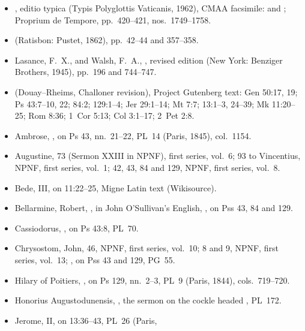 {\footnotesize
\begin{itemize}[leftmargin=1.2em,itemsep=.15em]
\item {}, editio typica (Typis
Polyglottis Vaticanis, 1962), CMAA facsimile:  and
; Proprium de Tempore,
pp.~420--421, nos.~1749--1758.
\item {} (Ratisbon: Pustet, 1862), pp.~42--44 and
357--358.
\item Lasance, F.~X., and Walsh, F.~A., , revised edition (New York: Benziger Brothers, 1945), pp.~196 and
744--747.
\item {} (Douay--Rheims,
Challoner revision), Project Gutenberg text: Gen 50:17, 19;
Ps 43:7--10, 22; 84:2; 129:1--4; Jer 29:1--14; Mt 7:7; 13:1--3, 24--39;
Mk 11:20--25; Rom 8:36; 1~Cor 5:13; Col 3:1--17; 2~Pet 2:8.
\item Ambrose, , on Ps 43, nn.~21--22, PL~14
(Paris, 1845), col.~1154.
\item Augustine,  73 (Sermon XXIII in NPNF), first series,
vol.~6;  93 to Vincentius, NPNF, first series, vol.~1;
 42, 43, 84 and 129, NPNF, first series,
vol.~8.
\item Bede,  III, on 11:22--25, Migne
Latin text (Wikisource).
\item Bellarmine, Robert, , in John O'Sullivan's
English, , on Pss 43, 84 and 129.
\item Cassiodorus, , on Ps 43:8, PL~70.
\item Chrysostom, John,  46, NPNF, first series,
vol.~10;  8 and 9, NPNF, first series, vol.~13;
, on Pss 43 and 129, PG~55.
\item Hilary of Poitiers, , on Ps 129,
nn.~2--3, PL~9 (Paris, 1844), cols.~719--720.
\item Honorius Augustodunensis, , the sermon on the
cockle headed , PL~172.
\item Jerome,  II, on 13:36--43, PL~26 (Paris,

\end{itemize}}

